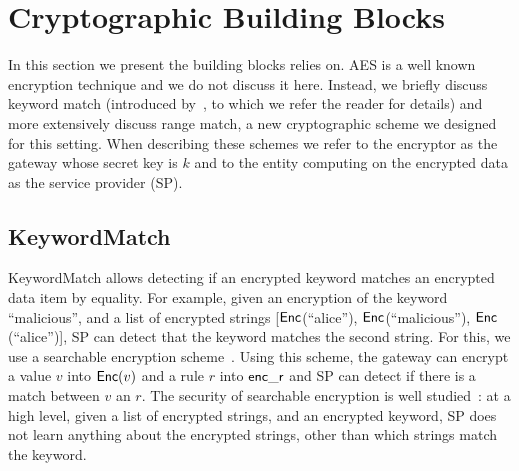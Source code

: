 


\section{Cryptographic Building Blocks}

In this section we present the building blocks \sys relies on.
AES is a well known encryption technique and we do not discuss it here. Instead, we briefly discuss keyword match (introduced by~\cite{blindbox}, to which we refer the reader for details) and more extensively discuss range match, a new cryptographic scheme we designed for this setting.
When describing these schemes we refer to the encryptor as the gateway whose secret key is $k$ and to the entity computing on the encrypted data as the service provider (SP).


\subsection{KeywordMatch}\label{s:kwmatch}


KeywordMatch allows detecting if an encrypted keyword matches an encrypted data item by equality.
For example, given an encryption of the keyword ``malicious'', and a list of encrypted strings  [$\mathsf{Enc}$(``alice''), $\mathsf{Enc}$(``malicious''), $\mathsf{Enc}$(``alice'')], SP can  detect that the keyword matches the second string. 
For  this, we use a searchable encryption scheme~\cite{song:search, blindbox}.
Using this scheme, the gateway can encrypt a value $v$ into $\mathsf{Enc}(v)$ and a rule $r$ into $\mathsf{enc\_r}$ and SP can detect if there is a match between $v$ an $r$. 
 The security of searchable encryption is well studied~\cite{song:search, blindbox}: at a high level,  given a list of encrypted strings, and an encrypted keyword, SP does not learn anything about the encrypted strings, other than which strings match the keyword. %



